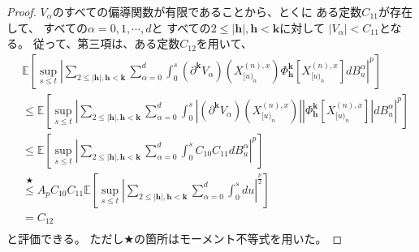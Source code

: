 \documentclass[uplatex]{jsarticle}
\theoremstyle{definition}
\def\E{\mathbb{E}}
\begin{document}
\begin{proof}
  \(V_\alpha\)のすべての偏導関数が有限であることから、とくに
  ある定数\(C_{11}\)が存在して、
  すべての\(\alpha=0,1,\cdots, d\)と
  すべての\(2 \leq |\mathbf{h}| , \mathbf{h} < \mathbf{k}\)に対して
  \(|V_\alpha|<C_{11}\)となる。
  従って、第三項は、ある定数\(C_{12}\)を用いて、
  \begin{align*}
    &\E\left[ \sup_{s \leq t}\left|
    \sum_{2\leq |\mathbf{h}| , \mathbf{h} < \mathbf{k}}\sum_{\alpha=0}^d
    \int_0^s \left( \partial^{\mathbf{k}} V_\alpha \right)
    \left( X_{[u)_n}^{(n),x}\right)
    \Phi_{\mathbf{h}}^{\mathbf{k}}\left[ X_{[u)_n}^{(n),x}\right] dB_u^\alpha
    \right|^p \right] \\
    &\leq \E\left[ \sup_{s \leq t}\left|
    \sum_{2\leq |\mathbf{h}| , \mathbf{h} < \mathbf{k}}\sum_{\alpha=0}^d
    \int_0^s \left| \left( \partial^{\mathbf{k}} V_\alpha \right)
    \left( X_{[u)_n}^{(n),x}\right)\right|
    \left| \Phi_{\mathbf{h}}^{\mathbf{k}}\left[ X_{[u)_n}^{(n),x}\right] \right|
    dB_u^\alpha \right|^p \right] \\
    &\leq \E\left[ \sup_{s \leq t}\left|
    \sum_{2\leq |\mathbf{h}| , \mathbf{h} < \mathbf{k}}\sum_{\alpha=0}^d
    \int_0^s C_{10}C_{11} dB_u^\alpha \right|^p \right] \\
    &\overset{\bigstar}{\leq} A_p C_{10}C_{11} \E\left[ \sup_{s \leq t}\left|
    \sum_{2\leq |\mathbf{h}| , \mathbf{h} < \mathbf{k}}\sum_{\alpha=0}^d
    \int_0^s du \right|^{\frac{p}{2}} \right] \\
    &= C_{12} \\
  \end{align*}
  と評価できる。
  ただし\(\bigstar\)の箇所はモーメント不等式を用いた。


\end{proof}
\end{document}
